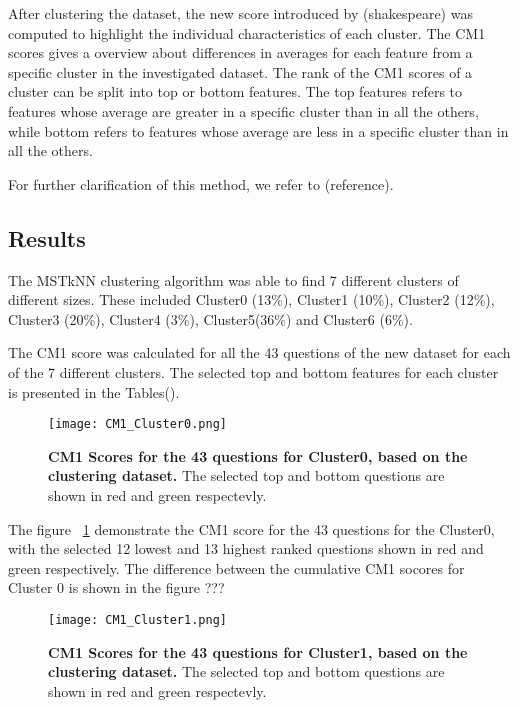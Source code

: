 \documentclass{article}
\begin{document}


After clustering the dataset, the new score introduced by (shakespeare) was
computed to highlight the individual characteristics of each cluster. The CM1
scores gives a overview about differences in averages for each feature from a
specific cluster in the investigated dataset. The rank of the CM1 scores of a
cluster can be split into top or bottom features. The top features refers to
features whose average are greater in a specific cluster than in all the others,
while bottom refers to features whose average are less in a specific cluster
than in all the others.






For further clarification of this method, we refer to (reference). 


\subsection{Results}

The MSTkNN clustering algorithm was able to find 7 different clusters of
different sizes. These included Cluster0 (13\%), Cluster1 (10\%), Cluster2
(12\%), Cluster3 (20\%), Cluster4 (3\%), Cluster5(36\%) and Cluster6 (6\%).

The CM1 score was calculated for all the 43 questions of the new dataset
for each of the 7 different clusters. The selected top and bottom features  
for each cluster is presented in the Tables().

\begin{figure}[h]
	\texttt{[image: CM1\_Cluster0.png]}
	\caption{\textbf{CM1 Scores for the 43 questions for Cluster0, based on the
	clustering dataset.} The selected top and bottom questions are shown in red
	and green respectevly.}
	\label{fig:Cluster0}
\end{figure}

The figure ~\ref{fig:Cluster0} demonstrate the CM1 score for the 43
questions for the Cluster0, with the selected 12 lowest and 13 highest ranked
questions shown in red and green respectively. The difference between the
cumulative CM1 socores for Cluster 0 is shown in the figure ???


\begin{figure}[h]
	\texttt{[image: CM1\_Cluster1.png]}
	\caption{\textbf{CM1 Scores for the 43 questions for Cluster1, based on the
	clustering dataset.} The selected top and bottom questions are shown in red
	and green respectevly.}
	\label{fig:Cluster1}
\end{figure}
\end{document}
